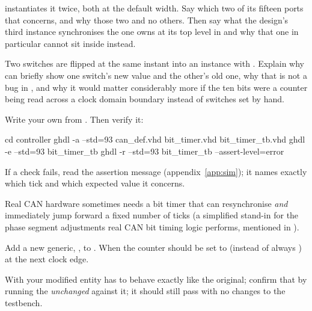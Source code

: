   instantiates it twice, both at the default width. Say which two of
its fifteen ports that concerns, and why those two and no others. Then say what the design's third
instance synchronises \textemdash{} the one  owns at its top level in
 \textemdash{} and why that one in particular cannot sit inside
 instead.

 Two switches are flipped at the same instant into an instance with .
Explain why  can briefly show one switch's new value and the other's old one, why that
is not a bug in , and why it would matter considerably more if the ten bits were a
counter being read across a clock domain boundary instead of switches set by hand.


\label{c12:ex:bittimer}
Write your own  from . Then verify it:

\begin{shell}
cd controller
ghdl -a --std=93 can_def.vhd bit_timer.vhd bit_timer_tb.vhd
ghdl -e --std=93 bit_timer_tb
ghdl -r --std=93 bit_timer_tb --assert-level=error
\end{shell}

If a check fails, read the assertion message (appendix~\ref{app:sim}); it names exactly which tick
and which expected value it concerns.

\label{c12:ex:offset}
Real CAN hardware sometimes needs a bit timer that can resynchronise \emph{and} immediately jump
forward a fixed number of ticks (a simplified stand-in for the phase segment adjustments real CAN bit
timing logic performs, mentioned in ).

 Add a new generic, , to . When
 the counter should be set to  (instead of always ) at
the next clock edge.

 With  your modified entity has to behave exactly like the original;
confirm that by running the \emph{unchanged}  against it; it should still pass
with no changes to the testbench.


